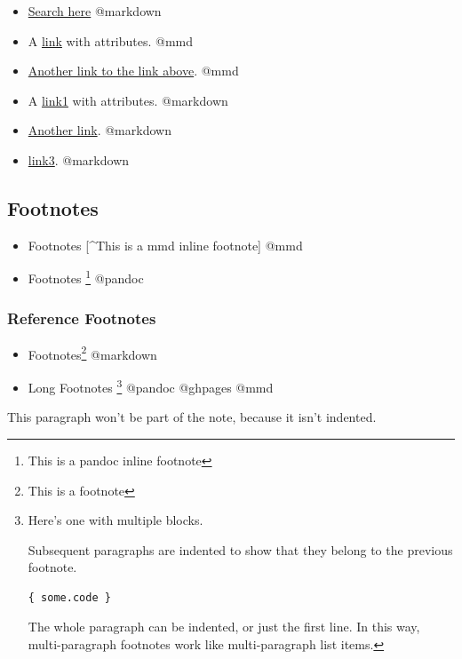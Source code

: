 \documentclass[]{article}
\providecommand{\tightlist}{%
  \setlength{\itemsep}{0pt}\setlength{\parskip}{0pt}}
\begin{document}
\begin{itemize}
\tightlist
\item
  \href{https://www.google.com}{Search here} @markdown
\item
  A \href{image.png}{link} with attributes. @mmd
\item
  \href{image.png}{Another link to the link above}. @mmd
\item
  A \href{/foo/bar.html}{link1} with attributes. @markdown
\item
  \href{http://fsf.org}{Another link}. @markdown
\item
  \href{/bar\#special}{link3}. @markdown
\end{itemize}

\subsection{Footnotes}\label{footnotes}

\begin{itemize}
\tightlist
\item
  Footnotes {[}\^{}This is a mmd inline footnote{]} @mmd
\item
  Footnotes \footnote{This is a pandoc inline footnote} @pandoc
\end{itemize}

\subsubsection{Reference Footnotes}\label{reference-footnotes}

\begin{itemize}
\tightlist
\item
  Footnotes\footnote{This is a footnote} @markdown
\item
  Long Footnotes \footnote{Here's one with multiple blocks.

    Subsequent paragraphs are indented to show that they belong to the
    previous footnote.

\begin{Verbatim}
{ some.code }
\end{Verbatim}

    The whole paragraph can be indented, or just the first line. In this
    way, multi-paragraph footnotes work like multi-paragraph list items.}
  @pandoc @ghpages @mmd
\end{itemize}

This paragraph won't be part of the note, because it isn't indented.
\end{document}
